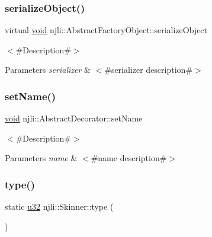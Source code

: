\mbox{\label{classnjli_1_1_skinner_a4fc4bcd9d1930911474210c047372fc0}} 
\subsubsection{\texorpdfstring{serialize\+Object()}{serializeObject()}}
{\footnotesize\ttfamily virtual \mbox{\hyperlink{_thread_8h_af1e856da2e658414cb2456cb6f7ebc66}{void}} njli\+::\+Abstract\+Factory\+Object\+::serialize\+Object}

$<$\#\+Description\#$>$


\begin{DoxyParams}{Parameters}
{\em serializer} & $<$\#serializer description\#$>$ \\
\hline
\end{DoxyParams}
\mbox{\label{classnjli_1_1_skinner_a087eb5f8d9f51cc476f12f1d10a3cb95}} 
\subsubsection{\texorpdfstring{set\+Name()}{setName()}}
{\footnotesize\ttfamily \mbox{\hyperlink{_thread_8h_af1e856da2e658414cb2456cb6f7ebc66}{void}} njli\+::\+Abstract\+Decorator\+::set\+Name}

$<$\#\+Description\#$>$


\begin{DoxyParams}{Parameters}
{\em name} & $<$\#name description\#$>$ \\
\hline
\end{DoxyParams}
\mbox{\label{classnjli_1_1_skinner_aa6ddbc193192b2e5ddcca57cd936e7a9}} 
\subsubsection{\texorpdfstring{type()}{type()}}
{\footnotesize\ttfamily static \mbox{\hyperlink{_util_8h_a10e94b422ef0c20dcdec20d31a1f5049}{u32}} njli\+::\+Skinner\+::type (\begin{DoxyParamCaption}{ }\end{DoxyParamCaption})\hspace{0.3cm}{\ttfamily [static]}}

